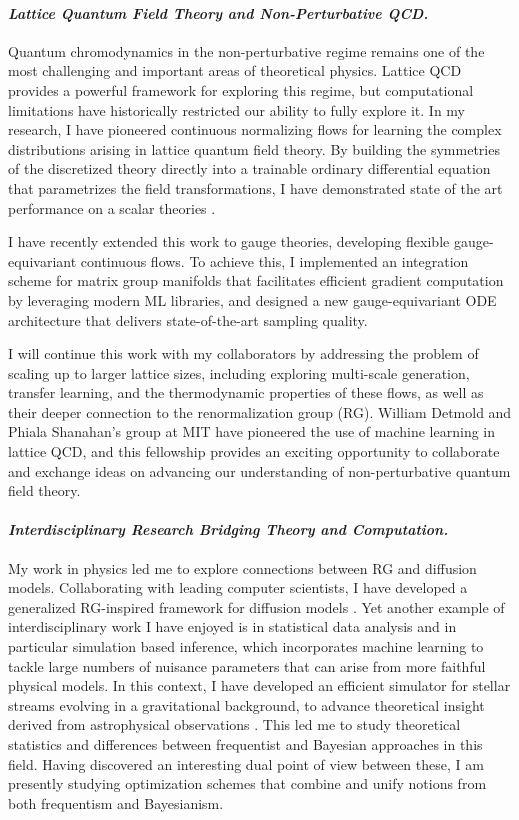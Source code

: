 \documentclass[11pt]{article}
\begin{document}
\paragraph{\textit{{Lattice Quantum Field Theory and Non-Perturbative QCD.}}}
Quantum chromodynamics in the non-perturbative regime remains one of the most challenging and important areas of theoretical physics.
Lattice QCD provides a powerful framework for exploring this regime, but computational limitations have historically restricted our ability to fully explore it.
In my research, I have pioneered continuous normalizing flows for learning the complex distributions arising in lattice quantum field theory. By building the symmetries of the discretized theory directly into a trainable ordinary differential equation that parametrizes the field transformations, I have demonstrated state of the art performance on a scalar theories \cite{gerdes2023LearningLattice}.


I have recently extended this work to gauge theories, developing flexible gauge-equivariant continuous flows.
To achieve this, I implemented an integration scheme for matrix group manifolds that facilitates efficient gradient computation by leveraging modern ML libraries, and designed a new gauge-equivariant ODE architecture that delivers state-of-the-art sampling quality.

\textbf{\color{royalblue}{Future Directions.}}
I will continue this work with my collaborators by addressing the problem of scaling up to larger lattice sizes, including exploring multi-scale generation, transfer learning, and the thermodynamic properties of these flows, as well as their deeper connection to the renormalization group (RG).
William Detmold and Phiala Shanahan's group at MIT have pioneered the use of machine learning in lattice QCD, and this fellowship provides an exciting opportunity to collaborate and exchange ideas on advancing our understanding of non-perturbative quantum field theory.

\paragraph{\textit{{Interdisciplinary Research Bridging Theory and Computation.}}}
My work in physics led me to explore connections between RG and diffusion models.
Collaborating with leading computer scientists, I have developed a generalized RG-inspired framework for diffusion models \cite{gerdes2024gudgenerationunifieddiffusion}.
Yet another example of interdisciplinary work I have enjoyed is in statistical data analysis and in particular simulation based inference, which incorporates machine learning to tackle large numbers of nuisance parameters that can arise from more faithful physical models.
In this context, I have developed an efficient simulator for stellar streams evolving in a gravitational background, to advance theoretical insight derived from astrophysical observations  \cite{alvey2023AlbatrossScalable}.
This led me to study theoretical statistics and differences between frequentist and Bayesian approaches in this field.
Having discovered an interesting dual point of view between these, I am presently studying optimization schemes that combine and unify notions from both frequentism and Bayesianism.
\end{document}
